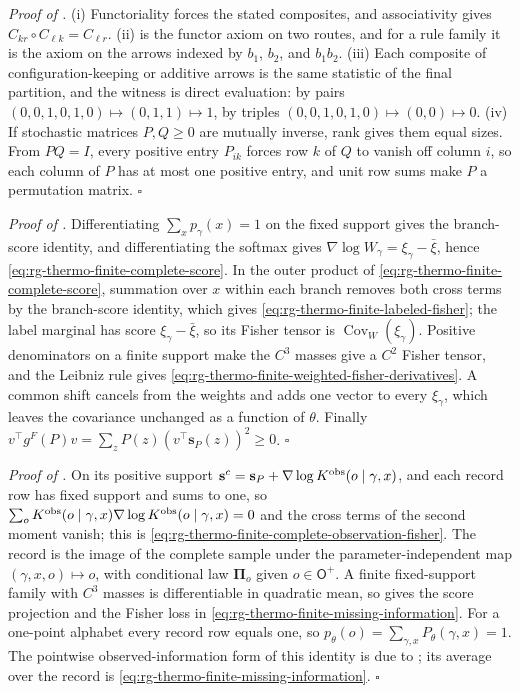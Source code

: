 \noindent\emph{Proof of .}
(i) Functoriality forces the stated composites, and associativity gives
$C_{kr}\circ C_{\ell k}=C_{\ell r}$. (ii) is the functor axiom on two routes, and for a rule
family it is the axiom on the arrows indexed by $b_1$, $b_2$, and $b_1b_2$. (iii) Each composite of
configuration-keeping or additive arrows is the same statistic of the final partition, and the
witness is direct evaluation: by pairs $(0,0,1,0,1,0)\mapsto(0,1,1)\mapsto1$, by triples
$(0,0,1,0,1,0)\mapsto(0,0)\mapsto0$. (iv) If stochastic matrices $P,Q\geq0$ are mutually inverse,
rank gives them equal sizes. From $PQ=I$, every positive entry $P_{ik}$ forces row $k$ of $Q$ to
vanish off column $i$, so each column of $P$ has at most one positive entry, and unit row sums make
$P$ a permutation matrix. $\square$

\noindent\emph{Proof of .}
Differentiating $\sum_xp_\gamma(x)=1$ on the fixed support gives the branch-score identity, and
differentiating the softmax gives $\nabla\log W_\gamma=\xi_\gamma-\bar\xi$, hence
\eqref{eq:rg-thermo-finite-complete-score}. In the outer product of
\eqref{eq:rg-thermo-finite-complete-score}, summation over $x$ within each branch removes both cross
terms by the branch-score identity, which gives \eqref{eq:rg-thermo-finite-labeled-fisher}; the
label marginal has score $\xi_\gamma-\bar\xi$, so its Fisher tensor is
$\operatorname{Cov}_W(\xi_\gamma)$. Positive denominators on a finite support make the $C^3$ masses
give a $C^2$ Fisher tensor, and the Leibniz rule gives
\eqref{eq:rg-thermo-finite-weighted-fisher-derivatives}. A common shift cancels from
the weights and adds one vector to every $\xi_\gamma$, which leaves the covariance unchanged as a
function of $\theta$. Finally $v^\top g^F(P)v=\sum_zP(z)(v^\top\mathbf s_P(z))^2\geq0$. $\square$

\noindent\emph{Proof of .}
On its positive support $\mathbf s^c=\mathbf s_P+\nabla\log K^{\mathrm{obs}}(o\mid\gamma,x)$, and
each record row has fixed support and sums to one, so
$\sum_oK^{\mathrm{obs}}(o\mid\gamma,x)\nabla\log K^{\mathrm{obs}}(o\mid\gamma,x)=0$ and the cross
terms of the second moment vanish; this is
\eqref{eq:rg-thermo-finite-complete-observation-fisher}. The record is the image of the complete
sample under the parameter-independent map $(\gamma,x,o)\mapsto o$, with conditional law
$\boldsymbol\Pi_o$ given $o\in\mathsf O^+$. A finite fixed-support family with $C^3$ masses is
differentiable in quadratic mean, so  gives the score projection
and the Fisher loss in \eqref{eq:rg-thermo-finite-missing-information}. For a one-point alphabet
every record row equals one, so $p_\theta(o)=\sum_{\gamma,x}P_\theta(\gamma,x)=1$. The pointwise
observed-information form of this identity is due to \citet{Louis1982}; its average over the record
is \eqref{eq:rg-thermo-finite-missing-information}. $\square$

